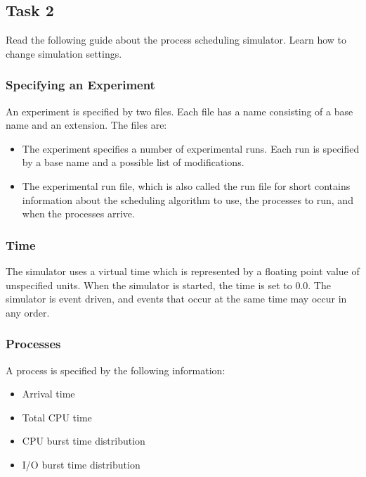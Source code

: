 \documentclass[16pt]{article}
\begin{document}
\newpage
\subsection*{Task 2}

Read the following guide about the process scheduling simulator. Learn how to change simulation settings.

\subsubsection*{Specifying an Experiment}

An experiment is specified by two files. Each file has a name consisting of a base name
and an extension. The files are:

\begin{itemize}
\item The experiment specifies a number of experimental runs.
Each run is specified by a base name and a possible list of modifications.

\item The experimental run file, which is also called the run file for short contains information about the scheduling algorithm to use,
the processes to run, and when the processes arrive.
\end{itemize}

\subsubsection*{Time}

The simulator uses a virtual time which is represented by a floating point value of
unspecified units. When the simulator is started, the time is set to 0.0. The simulator is
event driven, and events that occur at the same time may occur in any order.

\subsubsection*{Processes}

A process is specified by the following information:

\begin{itemize}
\item Arrival time
\item Total CPU time
\item CPU burst time distribution
\item I/O burst time distribution
\end{itemize}
\end{document}
